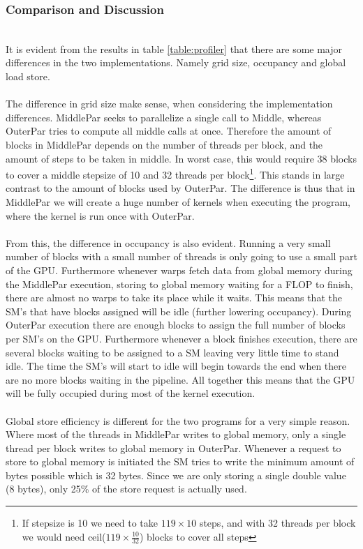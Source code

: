 \subsubsection{Comparison and Discussion} \hfill \\
It is evident from the results in table \ref{table:profiler} that there are some major differences in the two implementations. Namely grid size, occupancy and global load store.
\\ \\
The difference in grid size make sense, when considering the implementation differences. MiddlePar seeks to parallelize a single call to Middle, whereas OuterPar tries to compute all middle calls at once. Therefore the amount of blocks in MiddlePar depends on the number of threads per block, and the amount of steps to be taken in middle. In worst case, this would require 38 blocks to cover a middle stepsize of 10 and 32 threads per block\footnote{If stepsize is 10 we need to take $119 \times 10$ steps, and with 32 threads per block we would need ceil($119 \times \frac{10}{32}$) blocks to cover all steps}. This stands in large contrast to the amount of blocks used by OuterPar. The difference is thus that in MiddlePar we will create a huge number of kernels when executing the program, where the kernel is run once with OuterPar.
\\ \\
From this, the difference in occupancy is also evident. Running a very small number of blocks with a small number of threads is only going to use a small part of the GPU. Furthermore whenever warps fetch data from global memory during the MiddlePar execution, storing to global memory waiting for a FLOP to finish, there are almost no warps to take its place while it waits. This means that the SM's that have blocks assigned will be idle (further lowering occupancy). During OuterPar execution there are enough blocks to assign the full number of blocks per SM's on the GPU. Furthermore whenever a block finishes execution, there are several blocks waiting to be assigned to a SM leaving very little time to stand idle. The time the SM's will start to idle will begin towards the end when there are no more blocks waiting in the pipeline. All together this means that the GPU will be fully occupied during most of the kernel execution.
\\ \\
Global store efficiency is different for the two programs for a very simple reason. Where most of the threads in MiddlePar writes to global memory, only a single thread per block writes to global memory in OuterPar. Whenever a request to store to global memory is initiated the SM tries to write the minimum amount of bytes possible which is 32 bytes. Since we are only storing a single double value (8 bytes), only 25\% of the store request is actually used.

